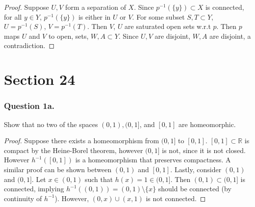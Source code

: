 \documentclass[12pt]{article}
\begin{document}
\begin{proof}
    Suppose $U, V$ form a separation of $X$. Since $p^{-1}(\{y\}) \subset X$
    is connected, for all $y \in Y$,  $p^{-1}(\{y\})$ is either in $U$ or $V$.
    For some subset $S, T \subset Y$, $U = p^{-1}(S)$, $V = p^{-1}(T)$.
    Then $V$, $U$ are saturated open sets w.r.t $p$. Then $p$ maps $U$ and $V$
    to open, sets, $W, A \subset Y$. Since $U, V$ are disjoint, $W, A$ are disjoint,
    a contradiction.
\end{proof}





\section{Section 24}
\subsubsection*{Question 1a.}
Show that no two of the spaces $(0, 1), (0, 1]$, and 
$[0, 1]$ are homeomorphic.

\begin{proof}
    Suppose there exists a homeomorphism from $(0, 1]$ to $[0, 1]$.
    $[0, 1] \subset \mathbb{R}$ is compact by the Heine-Borel theorem,
    however $(0, 1]$ is not, since it is not closed. However $h^{-1}([0, 1])$ 
    is a homeomorphism that preserves compactness.
    A similar proof can be shown between $(0, 1)$ and $[0, 1]$.
    Lastly, consider $(0, 1)$ and $(0, 1]$.
    Let $x \in (0, 1)$ such that $h(x) = 1 \in (0, 1]$.
    Then $(0, 1) \subset (0, 1]$ is connected, implying $h^{-1}((0, 1)) = 
    (0, 1) \setminus \{x\}$ should be connected
    (by continuity of $h^{-1}$). However, $(0, x) \cup (x, 1)$
    is not connected.
\end{proof}
\end{document}
